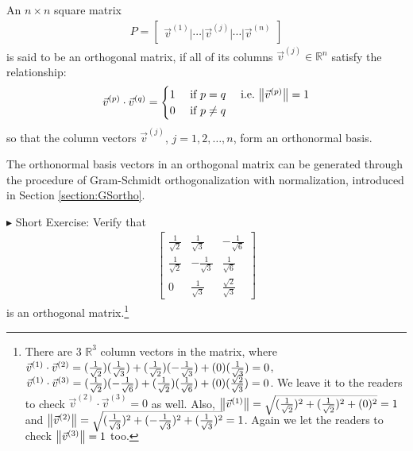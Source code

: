 \begin{defn}
\label{defn:orthomatrix}
An $n \times n$ square matrix
\begin{align*}
P = \begin{bmatrix}
\vec{v}^{(1)}|\cdots|\vec{v}^{(j)}|\cdots|\vec{v}^{(n)}   
\end{bmatrix}
\end{align*}
is said to be an orthogonal matrix, if all of its columns $\vec{v}^{(j)} \in \mathbb{R}^n$ satisfy the relationship:
\begin{align}
\vec{v}^{(p)} \cdot \vec{v}^{(q)} =
\begin{cases}
1 &\text{ if } p = q \quad \text{ i.e.\ } \norm{\vec{v}^{(p)}} = 1 \\
0 &\text{ if } p \neq q    
\end{cases}
\end{align}
so that the column vectors $\vec{v}^{(j)}$, $j=1,2,\ldots,n$, form an orthonormal basis.
\end{defn}
The orthonormal basis vectors in an orthogonal matrix can be generated through the procedure of Gram-Schmidt orthogonalization with normalization, introduced in Section \ref{section:GSortho}.\par
$\blacktriangleright$ Short Exercise: Verify that 
\begin{align*}
\begin{bmatrix}
\frac{1}{\sqrt{2}} & \frac{1}{\sqrt{3}} & -\frac{1}{\sqrt{6}} \\
\frac{1}{\sqrt{2}} & -\frac{1}{\sqrt{3}} & \frac{1}{\sqrt{6}} \\
0 & \frac{1}{\sqrt{3}} & \frac{\sqrt{2}}{\sqrt{3}}
\end{bmatrix}
\end{align*}
is an orthogonal matrix.\footnote{There are $3$ $\mathbb{R}^3$ column vectors in the matrix, where $\vec{v}^{(1)} \cdot \vec{v}^{(2)} = \smash{(\frac{1}{\sqrt{2}})(\frac{1}{\sqrt{3}})} + \smash{(\frac{1}{\sqrt{2}})(-\frac{1}{\sqrt{3}})} + \smash{(0)(\frac{1}{\sqrt{3}})} = 0$, $\vec{v}^{(1)} \cdot \vec{v}^{(3)} = \smash{(\frac{1}{\sqrt{2}})(-\frac{1}{\sqrt{6}})} + \smash{(\frac{1}{\sqrt{2}})(\frac{1}{\sqrt{6}})} + (0)(\frac{\sqrt{2}}{\sqrt{3}}) = 0$. We leave it to the readers to check $\vec{v}^{(2)} \cdot \vec{v}^{(3)} = 0$ as well. Also, $\norm{\vec{v}^{(1)}} = \smash{\sqrt{(\frac{1}{\sqrt{2}})^2 + (\frac{1}{\sqrt{2}})^2 + (0)^2}} = 1$ and $\norm{\vec{v}^{(2)}} = \smash{\sqrt{(\frac{1}{\sqrt{3}})^2 + (-\frac{1}{\sqrt{3}})^2 + (\frac{1}{\sqrt{3}})^2}} = 1$. Again we let the readers to check $\norm{\vec{v}^{(3)}} = 1$ too.}\par
